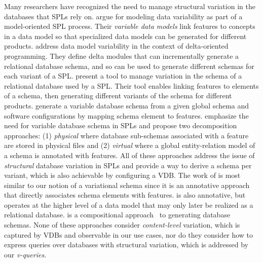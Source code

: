 Many researchers have recognized the need to manage structural variation in the
databases that SPLs rely on.
%
\citet{ad11varDataModel} argue for modeling data variability as part of a
model-oriented SPL process. Their \emph{variable data models}
link features to concepts in a data model so that specialized data models can
be generated for different products.
%
\citet{dbSchVarSPL} address data model variability in the context of
delta-oriented programming. They define delta modules that can incrementally
generate a relational database schema, and so
can be used to generate different schemas for each variant of a SPL.
%
\citet{varMngDBapp} present a tool to manage variation in the schema of a
relational database used by a SPL. Their tool enables
linking features to elements of a schema, then generating different variants of
the schema for different products.
%
\citet{slrs12CAiSE} generate a variable database schema from a given global schema and
software configurations by mapping schema element to features.
%
\citet{skrhas09DBIS} emphasize the need for variable database schema in SPLs and
propose two decomposition approaches: (1) \emph{physical} where database sub-schemas
associated with a feature are stored in physical files
and (2) \emph{virtual} where a global entity-relation model of a schema is annotated
with features.
%
All of these approaches address the issue of \emph{structural} database variation
in SPLs and provide a way to derive a schema per variant, 
which is also achievable by configuring a VDB.
%
The work of \citet{varMngDBapp} is most similar to our notion of a
variational schema since it is an annotative approach~\cite{KAK08} that
directly associates schema elements with features. \citet{ad11varDataModel}
is also annotative, but operates at the higher level of a data model that may
only later be realized as a relational database. \citet{dbSchVarSPL} is a
compositional approach~\cite{KAK08} to generating database schemas.
%
None of these approaches consider \emph{content-level} variation, which is
captured by VDBs and observable in our use cases, nor do they consider how
to express queries over databases with structural variation, which is addressed
by our \emph{v-queries}.


